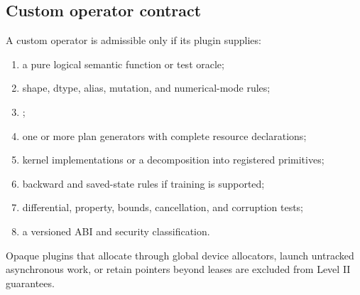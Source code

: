 \subsection{Custom operator contract}

A custom operator is admissible only if its plugin supplies:

\begin{enumerate}
  \item a pure logical semantic function or test oracle;
  \item shape, dtype, alias, mutation, and numerical-mode rules;
  \item {};
  \item one or more plan generators with complete resource declarations;
  \item kernel implementations or a decomposition into registered primitives;
  \item backward and saved-state rules if training is supported;
  \item differential, property, bounds, cancellation, and corruption tests;
  \item a versioned ABI and security classification.
\end{enumerate}

Opaque plugins that allocate through global device allocators, launch untracked asynchronous work, or retain pointers beyond leases are excluded from Level II guarantees.
